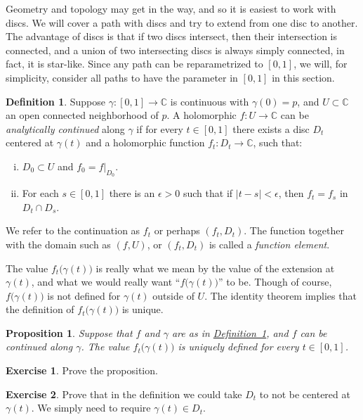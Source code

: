 \documentclass[12pt,openany]{book}
\newcommand{\sabs}[1]{\lvert {#1} \rvert}
\newcommand{\C}{{\mathbb{C}}}
\newcommand{\myindex}[1]{#1\index{#1}}
\newcommand{\myquote}[1]{``#1''}
\theoremstyle{plain}
\newtheorem{prop}[thm]{Proposition}
\theoremstyle{remark}
\theoremstyle{definition}
\newtheorem{defn}[thm]{Definition}
\newenvironment{exbox}{%
    \def\FrameCommand{\vrule width 1pt \relax\hspace{10pt}}%
    \MakeFramed{\advance\hsize-\width\FrameRestore}%
}{%
    \endMakeFramed
}
\theoremstyle{exercise}
\newtheorem{exercise}{Exercise}[section]
\theoremstyle{example}
\newcommand{\defnref}[1]{\hyperref[#1]{Definition~\ref*{#1}}}
\begin{document}
Geometry and topology may get in the way, and so it is easiest
to work with discs.  We will cover a path with discs and try to
extend from one disc to another.  The advantage of discs is that if two
discs intersect, then their intersection is connected, and a union of two
intersecting discs is always simply connected, in fact, it is star-like.
Since any path can be reparametrized to $[0,1]$, we will, for simplicity,
consider all paths to have the parameter in $[0,1]$ in this section.

\begin{defn} \label{defn:analcont}
Suppose $\gamma \colon [0,1] \to \C$ is continuous with $\gamma(0) = p$,
and $U \subset \C$ an open connected neighborhood of $p$.
A holomorphic 
$f \colon U \to \C$
can be
\emph{analytically continued}
along $\gamma$
if for every $t \in [0,1]$ there exists
a disc $D_t$ centered at $\gamma(t)$ and a holomorphic function
$f_t \colon D_t \to \C$, such that:
\begin{enumerate}[(i)]
\item
$D_0 \subset U$ and $f_0 = f|_{D_0}$.
\item
For each $s \in [0,1]$ there is an
$\epsilon > 0$ such that if $\sabs{t-s} < \epsilon$, then
$f_t = f_s$ in $D_t \cap D_s$.
\end{enumerate}
We refer to the continuation as $f_t$ or perhaps $(f_t,D_t)$.
The function together with the domain such as $(f,U)$, or $(f_t,D_t)$
is called a \emph{\myindex{function element}}.
\end{defn}

The value
$f_t\bigl(\gamma(t)\bigr)$ is really what we mean by the value of
the extension at $\gamma(t)$, and what we would really want
\myquote{$f\bigl(\gamma(t)\bigr)$} to be.
Though of course, $f\bigl(\gamma(t)\bigr)$ is not defined for $\gamma(t)$ outside of
$U$.
The identity theorem implies that the definition of
$f_t\bigl(\gamma(t)\bigr)$ is unique.

\begin{prop}
Suppose that $f$ and $\gamma$ are as in \defnref{defn:analcont},
and
$f$ can be continued along $\gamma$.
The value $f_t\bigl(\gamma(t)\bigr)$ is uniquely
defined for every $t \in [0,1]$.
\end{prop}

\begin{exbox}
\begin{exercise}
Prove the proposition.
\end{exercise}

\begin{exercise}
Prove that in the definition we could take $D_t$ to not be centered at
$\gamma(t)$.  We simply need to require $\gamma(t) \in D_t$.
\end{exercise}
\end{exbox}
\end{document}
